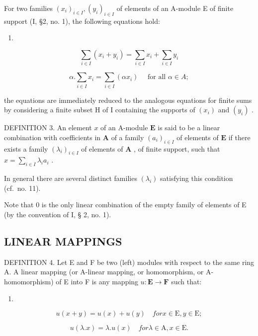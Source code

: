 For two families \((x_{i})_{i\in I}, (y_{i})_{i\in I}\) of elements of an A-module E of finite support (I, §2, no. 1), the following equations hold:

\begin{enumerate}
\def\labelenumi{(\arabic{enumi})}
\tightlist
\item
\end{enumerate}

\[
\sum_ {i \in I} (x _ {i} + y _ {i}) = \sum_ {i \in I} x _ {i} + \sum_ {i \in I} y _ {i}\tag{2}
\]

\[
\alpha . \sum_ {i \in I} x _ {i} = \sum_ {i \in I} (\alpha x _ {i}) \quad \text { for   all } \alpha \in A;
\]

the equations are immediately reduced to the analogous equations for finite sums by considering a finite subset H of I containing the supports of \((x_{i})\) and \((y_{i})\) .

DEFINITION 3. An element \(x\) of an A-module \(\mathbf{E}\) is said to be a linear combination with coefficients in \(\mathbf{A}\) of a family \((a_{i})_{i\in I}\) of elements of \(\mathbf{E}\) if there exists a family \((\lambda_{i})_{i\in I}\) of elements of \(\mathbf{A}\) , of finite support, such that \(x = \sum_{i\in I}\lambda_{i}a_{i}\) .

In general there are several distinct families \((\lambda_{i})\) satisfying this condition (cf.~no. 11).

Note that 0 is the only linear combination of the empty family of elements of E (by the convention of I, § 2, no. 1).

\subsection{LINEAR MAPPINGS}

DEFINITION 4. Let E and F be two (left) modules with respect to the same ring A. A linear mapping (or A-linear mapping, or homomorphism, or A-homomorphism) of E into F is any mapping \(u: \mathbf{E} \to \mathbf{F}\) such that:

\begin{enumerate}
\def\labelenumi{(\arabic{enumi})}
\setcounter{enumi}{2}
\tightlist
\item
\end{enumerate}

\[
u (x + y) = u (x) + u (y) \quad for x \in \mathrm{E}, y \in \mathrm{E};\tag{4G}
\]

\[
u (\lambda . x) = \lambda . u (x) \quad for \lambda \in \mathrm{A}, x \in \mathrm{E}.
\]

